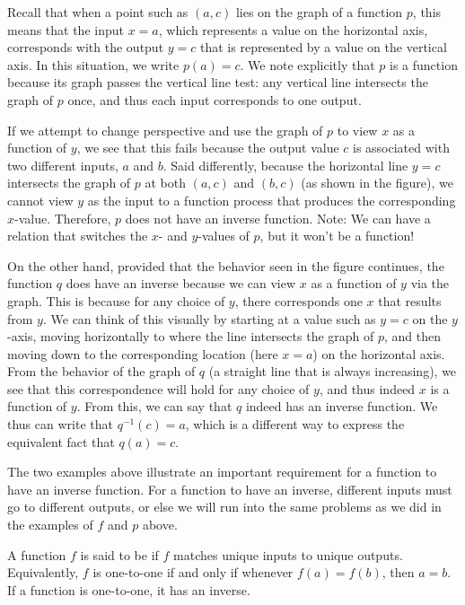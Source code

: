 \documentclass[nooutcomes]{ximera}
\begin{document}
Recall that when a point such as $(a,c)$ lies on the graph of a function $p$, this means that the input $x = a$, which represents a value on the horizontal axis, corresponds with the output $y = c$ that is represented by a value on the vertical axis.  In this situation, we write $p(a) = c$.  We note explicitly that $p$ is a function because its graph passes the vertical line test: any vertical line intersects the graph of $p$ once, and thus each input corresponds to one output.

If we attempt to change perspective and use the graph of $p$ to view $x$ as a function of $y$, we see that this fails because the output value $c$ is associated with two different inputs, $a$ and $b$.  Said differently, because the horizontal line $y = c$ intersects the graph of $p$ at both $(a,c)$ and $(b,c)$ (as shown in the figure), we cannot view $y$ as the input to a function process that produces the corresponding $x$-value.  Therefore, $p$ does not have an inverse function. Note: We can have a relation that switches the $x$- and $y$-values of $p$, but it won't be a function!

On the other hand, provided that the behavior seen in the figure continues, the function $q$ does have an inverse because we can view $x$ as a function of $y$ via the graph.  This is because for any choice of $y$, there corresponds one $x$ that results from $y$.  We can think of this visually by starting at a value such as $y = c$ on the $y$-axis, moving horizontally to where the line intersects the graph of $p$, and then moving down to the corresponding location (here $x = a$) on the horizontal axis.  From the behavior of the graph of $q$ (a straight line that is always increasing), we see that this correspondence will hold for any choice of $y$, and thus indeed $x$ is a function of $y$.  From this, we can say that $q$ indeed has an inverse function.  We thus can write that $q^{-1}(c) = a$, which is a different way to express the equivalent fact that $q(a) = c$.

The two examples above illustrate an important requirement for a function to have an inverse function. For a function to have an inverse, different inputs must go to different outputs, or else we will run into the same problems as we did in the examples of $f$ and $p$ above.

\begin{definition}
A function $f$ is said to be   if $f$ matches unique inputs to unique
outputs. Equivalently, $f$ is one-to-one if and only if whenever $f(a) = f(b)$, then $a = b$. If a function is one-to-one, it has an inverse.
\end{definition}
\end{document}
